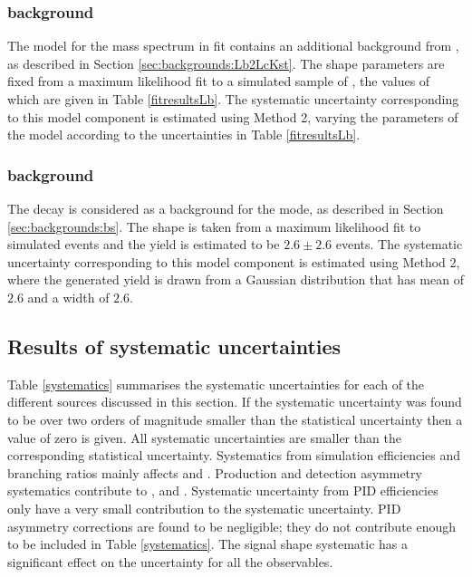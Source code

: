 \subsubsection{\boldmath {} background}

The model for the \kk mass spectrum in \CP fit contains an additional background from , as described in Section \ref{sec:backgrounds:Lb2LcKst}. The shape parameters are fixed from a maximum likelihood fit to a simulated sample of , the values of which are given in Table \ref{fitresultsLb}. The systematic uncertainty corresponding to this model component is estimated using Method 2, varying the parameters of the model according to the uncertainties in Table \ref{fitresultsLb}.

\subsubsection{\boldmath {} background}

The decay  is considered as a background for the \pik mode, as described in Section \ref{sec:backgrounds:bs}. The shape is taken from a maximum likelihood fit to simulated events and the yield is estimated to be $2.6 \pm 2.6$ events. The systematic uncertainty corresponding to this model component is estimated using Method 2, where the generated yield is drawn from a Gaussian distribution that has mean of $2.6$ and a width of $2.6$.

\subsection{Results of systematic uncertainties}

Table \ref{systematics} summarises the systematic uncertainties for each of the different sources discussed in this section. If the systematic uncertainty was found to be over two orders of magnitude smaller than the statistical uncertainty then a value of zero is given. All systematic uncertainties are smaller than the corresponding statistical uncertainty. Systematics from simulation efficiencies and branching ratios mainly affects \Rkk and \Rpipi. Production and detection asymmetry systematics contribute to \Akpi, \Akk and \Apipi. Systematic uncertainty from PID efficiencies only have a very small contribution to the systematic uncertainty. PID asymmetry corrections are found to be negligible; they do not contribute enough to be included in Table \ref{systematics}. The signal shape systematic has a significant effect on the uncertainty for all the \CP observables. 

